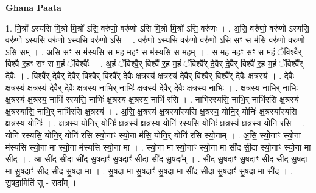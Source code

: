 \documentclass[17pt]{extarticle}
\begin{document}
\textbf{Ghana Paata } \newline

1. मि॒त्रो᳚ ऽस्यसि मि॒त्रो मि॒त्रो॑ ऽसि॒ वरु॑णो॒ वरु॑णो ऽसि मि॒त्रो मि॒त्रो॑ ऽसि॒ वरु॑णः । . अ॒सि॒ वरु॑णो॒ वरु॑णो ऽस्यसि॒ वरु॑णो ऽस्यसि॒ वरु॑णो ऽस्यसि॒ वरु॑णो ऽसि । . वरु॑णो ऽस्यसि॒ वरु॑णो॒ वरु॑णो ऽसि॒ सꣳ स म॑सि॒ वरु॑णो॒ वरु॑णो ऽसि॒ सम् । . अ॒सि॒ सꣳ स म॑स्यसि॒ स म॒ह म॒हꣳ स म॑स्यसि॒ स म॒हम् । . स म॒ह म॒हꣳ सꣳ स म॒हं ॅविश्वै॒र् विश्वै॑ र॒हꣳ सꣳ स म॒हं ॅविश्वैः᳚ । . अ॒हं ॅविश्वै॒र् विश्वै॑ र॒ह म॒हं ॅविश्वै᳚र् दे॒वैर् दे॒वैर् विश्वै॑ र॒ह म॒हं ॅविश्वै᳚र् दे॒वैः । . विश्वै᳚र् दे॒वैर् दे॒वैर् विश्वै॒र् विश्वै᳚र् दे॒वैः क्ष॒त्रस्य॑ क्ष॒त्रस्य॑ दे॒वैर् विश्वै॒र् विश्वै᳚र् दे॒वैः क्ष॒त्रस्य॑ । . दे॒वैः क्ष॒त्रस्य॑ क्ष॒त्रस्य॑ दे॒वैर् दे॒वैः क्ष॒त्रस्य॒ नाभि॒र् नाभिः॑ क्ष॒त्रस्य॑ दे॒वैर् दे॒वैः क्ष॒त्रस्य॒ नाभिः॑ । . क्ष॒त्रस्य॒ नाभि॒र् नाभिः॑ क्ष॒त्रस्य॑ क्ष॒त्रस्य॒ नाभि॑ रस्यसि॒ नाभिः॑ क्ष॒त्रस्य॑ क्ष॒त्रस्य॒ नाभि॑ रसि । . नाभि॑रस्यसि॒ नाभि॒र् नाभि॑रसि क्ष॒त्रस्य॑ क्ष॒त्रस्या॑सि॒ नाभि॒र् नाभि॑रसि क्ष॒त्रस्य॑ । . अ॒सि॒ क्ष॒त्रस्य॑ क्ष॒त्रस्या᳚स्यसि क्ष॒त्रस्य॒ योनि॒र् योनिः॑ क्ष॒त्रस्या᳚स्यसि क्ष॒त्रस्य॒ योनिः॑ । . क्ष॒त्रस्य॒ योनि॒र् योनिः॑ क्ष॒त्रस्य॑ क्ष॒त्रस्य॒ योनि॑ रस्यसि॒ योनिः॑ क्ष॒त्रस्य॑ क्ष॒त्रस्य॒ योनि॑ रसि । . योनि॑ रस्यसि॒ योनि॒र् योनि॑ रसि स्यो॒नाꣳ स्यो॒ना म॑सि॒ योनि॒र् योनि॑ रसि स्यो॒नाम् । . अ॒सि॒ स्यो॒नाꣳ स्यो॒ना म॑स्यसि स्यो॒ना मा स्यो॒ना म॑स्यसि स्यो॒ना मा । . स्यो॒ना मा स्यो॒नाꣳ स्यो॒ना मा सी॑द सी॒दा स्यो॒नाꣳ स्यो॒ना मा सी॑द । . आ सी॑द सी॒दा सी॑द सु॒षदाꣳ॑ सु॒षदाꣳ॑ सी॒दा सी॑द सु॒षदा᳚म् । . सी॒द॒ सु॒षदाꣳ॑ सु॒षदाꣳ॑ सीद सीद सु॒षदा॒ मा सु॒षदाꣳ॑ सीद सीद सु॒षदा॒ मा । . सु॒षदा॒ मा सु॒षदाꣳ॑ सु॒षदा॒ मा सी॑द सी॒दा सु॒षदाꣳ॑ सु॒षदा॒ मा सी॑द । . सु॒षदा॒मिति॑ सु - सदा᳚म् । \newline
\end{document}
